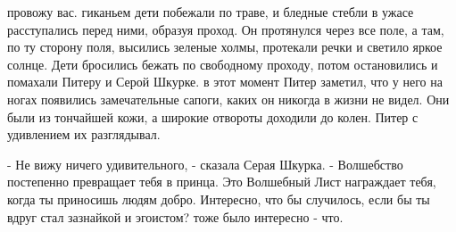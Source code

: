 провожу вас.
 гиканьем дети побежали по траве, и бледные стебли в ужасе 
расступались перед ними, образуя проход. Он протянулся через все поле, 
а там, по ту сторону поля, высились зеленые холмы, протекали речки и 
светило яркое солнце. Дети бросились бежать по свободному проходу, 
потом остановились и помахали Питеру и Серой Шкурке.
 в этот момент Питер заметил, что у него на ногах появились 
замечательные сапоги, каких он никогда в жизни не видел. Они были из 
тончайшей кожи, а широкие отвороты доходили до колен. Питер с 
удивлением их разглядывал.
\par- Не вижу ничего удивительного, - сказала Серая Шкурка. - 
Волшебство постепенно превращает тебя в принца. Это Волшебный Лист 
награждает тебя, когда ты приносишь людям добро. Интересно, что бы 
случилось, если бы ты вдруг стал зазнайкой и эгоистом?
 тоже было интересно - что.
